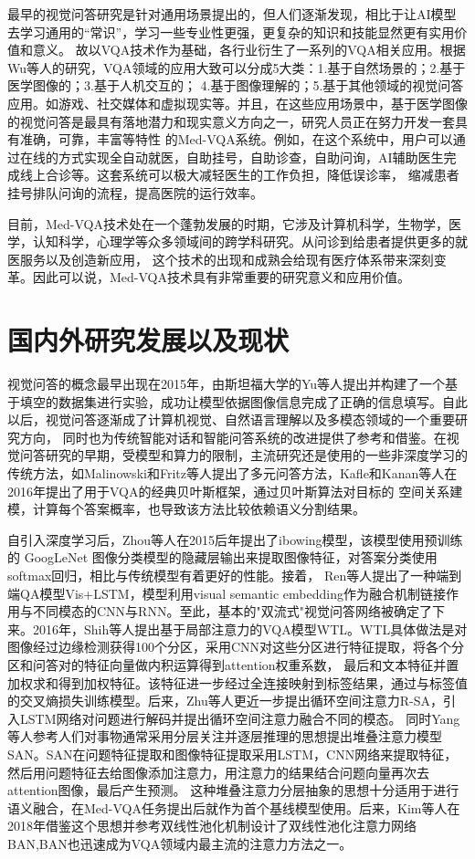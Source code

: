 最早的视觉问答研究是针对通用场景提出的，但人们逐渐发现，相比于让AI模型去学习通用的“常识”，学习一些专业性更强，更复杂的知识和技能显然更有实用价值和意义。
故以VQA技术作为基础，各行业衍生了一系列的VQA相关应用。根据Wu等人\cite{wu2017visual}的研究，VQA领域的应用大致可以分成5大类：1.基于自然场景的；2.基于医学图像的；3.基于人机交互的；
4.基于图像理解的；5.基于其他领域的视觉问答应用。如游戏、社交媒体和虚拟现实等。并且，在这些应用场景中，基于医学图像的视觉问答是最具有落地潜力和现实意义方向之一，研究人员正在努力开发一套具有准确，可靠，丰富等特性
的Med-VQA系统。例如，在这个系统中，用户可以通过在线的方式实现全自动就医，自助挂号，自助诊查，自助问询，AI辅助医生完成线上合诊等。这套系统可以极大减轻医生的工作负担，降低误诊率，
缩减患者挂号排队问询的流程，提高医院的运行效率。

目前，Med-VQA技术处在一个蓬勃发展的时期，它涉及计算机科学，生物学，医学，认知科学，心理学等众多领域间的跨学科研究。从问诊到给患者提供更多的就医服务以及创造新应用，
这个技术的出现和成熟会给现有医疗体系带来深刻变革。因此可以说，Med-VQA技术具有非常重要的研究意义和应用价值。

%
\section{国内外研究发展以及现状}
视觉问答的概念最早出现在2015年，由斯坦福大学的Yu等人\cite{yu2015visual}提出并构建了一个基于填空的数据集进行实验，成功让模型依据图像信息完成了正确的信息填写。自此以后，视觉问答逐渐成了计算机视觉、自然语言理解以及多模态领域的一个重要研究方向，
同时也为传统智能对话和智能问答系统的改进提供了参考和借鉴。在视觉问答研究的早期，受模型和算力的限制，主流研究还是使用的一些非深度学习的传统方法，如Malinowski和Fritz等人提出了多元问答方法\cite{malinowski2014multi}，Kafle和Kanan等人\cite{kafle2016answer}在2016年提出了用于VQA的经典贝叶斯框架，通过贝叶斯算法对目标的
空间关系建模，计算每个答案概率，也导致该方法比较依赖语义分割结果。

自引入深度学习后，Zhou等人\cite{zhou2015simple}在2015后年提出了ibowing模型，该模型使用预训练的 GoogLeNet 图像分类模型的隐藏层输出来提取图像特征，对答案分类使用softmax回归，相比与传统模型有着更好的性能。接着，
Ren等人\cite{ren2015exploring}提出了一种端到端QA模型Vis+LSTM，模型利用visual semantic embedding作为融合机制链接作用与不同模态的CNN与RNN。至此，基本的"双流式"视觉问答网络被确定了下来。2016年，Shih等人\cite{shih2016look}提出基于局部注意力的VQA模型WTL。WTL具体做法是对图像经过边缘检测获得100个分区，采用CNN对这些分区进行特征提取，将各个分区和问答对的特征向量做内积运算得到attention权重系数，
最后和文本特征并置加权求和得到加权特征。该特征进一步经过全连接映射到标签结果，通过与标签值的交叉熵损失训练模型。后来，Zhu等人\cite{zhu2016visual7w}更近一步提出循环空间注意力R-SA，引入LSTM网络对问题进行解码并提出循环空间注意力融合不同的模态。
同时Yang等人\cite{yang2016stacked}参考人们对事物通常采用分层关注并逐层推理的思想提出堆叠注意力模型SAN。SAN在问题特征提取和图像特征提取采用LSTM，CNN网络来提取特征，然后用问题特征去给图像添加注意力，用注意力的结果结合问题向量再次去attention图像，最后产生预测。
这种堆叠注意力分层抽象的思想十分适用于进行语义融合，在Med-VQA任务提出后就作为首个基线模型使用\cite{liu2016attention}。后来，Kim等人在2018年借鉴这个思想并参考双线性池化机制设计了双线性池化注意力网络BAN\cite{kim2018bilinear},BAN也迅速成为VQA领域内最主流的注意力方法之一。

